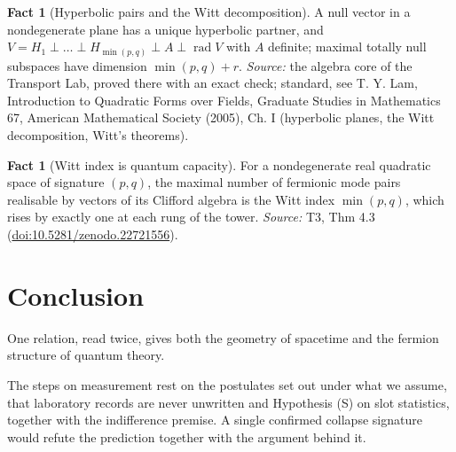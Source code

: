 \documentclass[11pt]{article}
\theoremstyle{definition}
\newtheorem{fact}[theorem]{Fact}
\theoremstyle{plain}
\begin{document}
\begin{fact}[Hyperbolic pairs and the Witt decomposition]\label{c:std-algebra.witt-decomposition}
A null vector in a nondegenerate plane has a unique hyperbolic partner, and $V = H_1 \perp \dots \perp H_{\min(p,q)} \perp A \perp \operatorname{rad} V$ with $A$ definite; maximal totally null subspaces have dimension $\min(p,q) + r$.
\emph{Source:} the algebra core of the Transport Lab, proved there with an exact check; standard, see T. Y. Lam, Introduction to Quadratic Forms over Fields, Graduate Studies in Mathematics 67, American Mathematical Society (2005), Ch. I (hyperbolic planes, the Witt decomposition, Witt's theorems).
\end{fact}

\begin{fact}[Witt index is quantum capacity]\label{c:tower.witt-index-quantum-capacity}
For a nondegenerate real quadratic space of signature $(p,q)$, the maximal number of fermionic mode pairs realisable by vectors of its Clifford algebra is the Witt index $\min(p,q)$, which rises by exactly one at each rung of the tower.
\emph{Source:} T3, Thm 4.3 (\href{https://doi.org/10.5281/zenodo.22721556}{doi:10.5281/zenodo.22721556}).
\end{fact}

\section*{Conclusion}
One relation, read twice, gives both the geometry of spacetime and the fermion structure of quantum theory.

The steps on measurement rest on the postulates set out under what we assume, that laboratory records are never unwritten and Hypothesis (S) on slot statistics, together with the indifference premise. A single confirmed collapse signature would refute the prediction together with the argument behind it.
\end{document}
